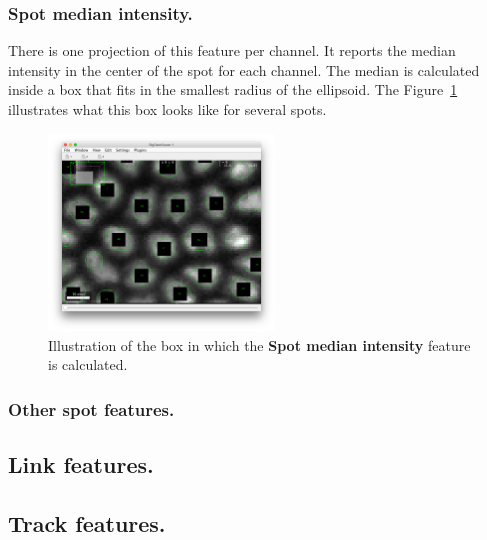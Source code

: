 \subsubsection{Spot median intensity.}

There is one projection of this feature per channel.
It reports the median intensity in the center of the spot for each channel.
The median is calculated inside a box that fits in the smallest radius of the ellipsoid.
The Figure~\ref{fig:SpotMedianBox} illustrates what this box looks like for several spots.

\begin{figure}
    \centering
    \includegraphics[width=6cm]{figures/Mastodon_Median-feature-pixels.png}
    \caption{Illustration of the box in which the \textbf{Spot median intensity} feature is calculated.}
    \label{fig:SpotMedianBox}
\end{figure}

\subsubsection{Other spot features.}


\subsection{Link features.}

\subsection{Track features.}